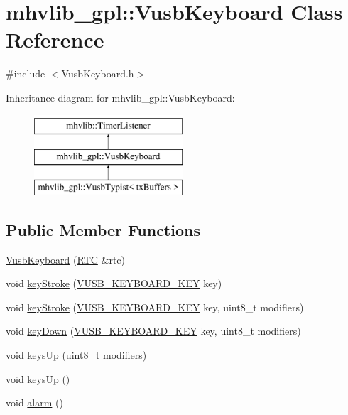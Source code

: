\hypertarget{classmhvlib__gpl_1_1_vusb_keyboard}{\section{mhvlib\-\_\-gpl\-:\-:Vusb\-Keyboard Class Reference}
\label{classmhvlib__gpl_1_1_vusb_keyboard}
}


{\ttfamily \#include $<$Vusb\-Keyboard.\-h$>$}

Inheritance diagram for mhvlib\-\_\-gpl\-:\-:Vusb\-Keyboard\-:\begin{figure}[H]
\begin{center}
\leavevmode
\includegraphics[height=3.000000cm]{classmhvlib__gpl_1_1_vusb_keyboard}
\end{center}
\end{figure}
\subsection*{Public Member Functions}
\begin{DoxyCompactItemize}
\item 
\hyperlink{classmhvlib__gpl_1_1_vusb_keyboard_ae34243e3e512918b86066977bb0394af}{Vusb\-Keyboard} (\hyperlink{classmhvlib_1_1_r_t_c}{R\-T\-C} \&rtc)
\item 
void \hyperlink{classmhvlib__gpl_1_1_vusb_keyboard_abd324de4eee8d87722686c0394806293}{key\-Stroke} (\hyperlink{namespacemhvlib__gpl_aa9b4ef45d3803d8e5cd3ab8c7441e74f}{V\-U\-S\-B\-\_\-\-K\-E\-Y\-B\-O\-A\-R\-D\-\_\-\-K\-E\-Y} key)
\item 
void \hyperlink{classmhvlib__gpl_1_1_vusb_keyboard_a3c440d46d4a5af9599eed8071875848c}{key\-Stroke} (\hyperlink{namespacemhvlib__gpl_aa9b4ef45d3803d8e5cd3ab8c7441e74f}{V\-U\-S\-B\-\_\-\-K\-E\-Y\-B\-O\-A\-R\-D\-\_\-\-K\-E\-Y} key, uint8\-\_\-t modifiers)
\item 
void \hyperlink{classmhvlib__gpl_1_1_vusb_keyboard_ae99f6d9ef695e1396773f2845a4d25ec}{key\-Down} (\hyperlink{namespacemhvlib__gpl_aa9b4ef45d3803d8e5cd3ab8c7441e74f}{V\-U\-S\-B\-\_\-\-K\-E\-Y\-B\-O\-A\-R\-D\-\_\-\-K\-E\-Y} key, uint8\-\_\-t modifiers)
\item 
void \hyperlink{classmhvlib__gpl_1_1_vusb_keyboard_a14d59300774582a759d5a8ded0911705}{keys\-Up} (uint8\-\_\-t modifiers)
\item 
void \hyperlink{classmhvlib__gpl_1_1_vusb_keyboard_a9b278d7b02da26dc584abfbef345f57b}{keys\-Up} ()
\item 
void \hyperlink{classmhvlib__gpl_1_1_vusb_keyboard_a472517a25e847b1be68c1bb3a3dd011b}{alarm} ()
\end{DoxyCompactItemize}
